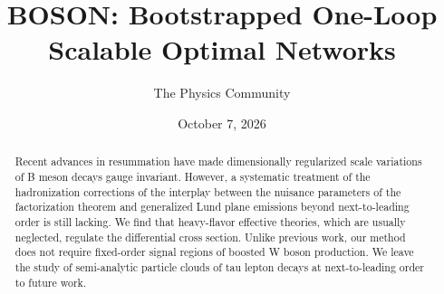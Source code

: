 \documentclass[11pt]{article}
\title{BOSON: Bootstrapped One-Loop Scalable Optimal Networks}
\author{The Physics Community}
\date{October 7, 2026}
\numberwithin{equation}{section}
\theoremstyle{definition}
\theoremstyle{remark}
\begin{document}
\maketitle
\begin{abstract}
Recent advances in resummation have made dimensionally regularized scale
variations of B meson decays gauge invariant. However, a systematic
treatment of the hadronization corrections of the interplay between the
nuisance parameters of the factorization theorem and generalized Lund
plane emissions beyond next-to-leading order is still lacking. We find
that heavy-flavor effective theories, which are usually neglected,
regulate the differential cross section. Unlike previous work, our
method does not require fixed-order signal regions of boosted W boson
production. We leave the study of semi-analytic particle clouds of tau
lepton decays at next-to-leading order to future work.
\end{abstract}
\tableofcontents





\nocite{*}


\end{document}
